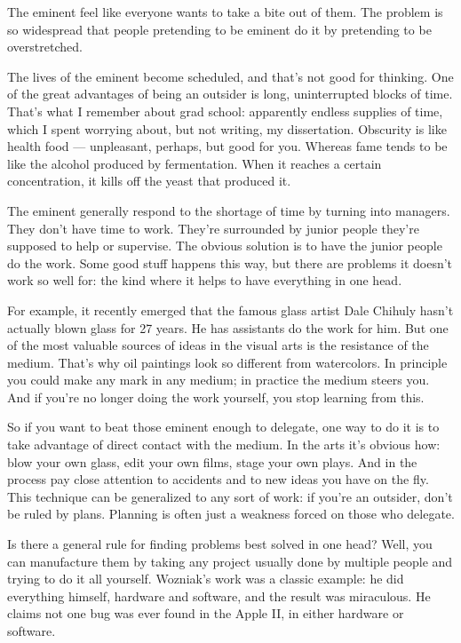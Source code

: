 \documentclass[12pt]{book}
\begin{document}
The eminent feel like everyone wants to take a bite out of them. The
problem is so widespread that people pretending to be eminent do it by
pretending to be overstretched.

The lives of the eminent become scheduled, and that's not good for
thinking. One of the great advantages of being an outsider is long,
uninterrupted blocks of time. That's what I remember about grad school:
apparently endless supplies of time, which I spent worrying about, but
not writing, my dissertation. Obscurity is like health food ---
unpleasant, perhaps, but good for you. Whereas fame tends to be like the
alcohol produced by fermentation. When it reaches a certain
concentration, it kills off the yeast that produced it.

The eminent generally respond to the shortage of time by turning into
managers. They don't have time to work. They're surrounded by junior
people they're supposed to help or supervise. The obvious solution is to
have the junior people do the work. Some good stuff happens this way,
but there are problems it doesn't work so well for: the kind where it
helps to have everything in one head.

For example, it recently emerged that the famous glass artist Dale
Chihuly hasn't actually blown glass for 27 years. He has assistants do
the work for him. But one of the most valuable sources of ideas in the
visual arts is the resistance of the medium. That's why oil paintings
look so different from watercolors. In principle you could make any mark
in any medium; in practice the medium steers you. And if you're no
longer doing the work yourself, you stop learning from this.

So if you want to beat those eminent enough to delegate, one way to do
it is to take advantage of direct contact with the medium. In the arts
it's obvious how: blow your own glass, edit your own films, stage your
own plays. And in the process pay close attention to accidents and to
new ideas you have on the fly. This technique can be generalized to any
sort of work: if you're an outsider, don't be ruled by plans. Planning
is often just a weakness forced on those who delegate.

Is there a general rule for finding problems best solved in one head?
Well, you can manufacture them by taking any project usually done by
multiple people and trying to do it all yourself. Wozniak's work was a
classic example: he did everything himself, hardware and software, and
the result was miraculous. He claims not one bug was ever found in the
Apple II, in either hardware or software.
\end{document}
